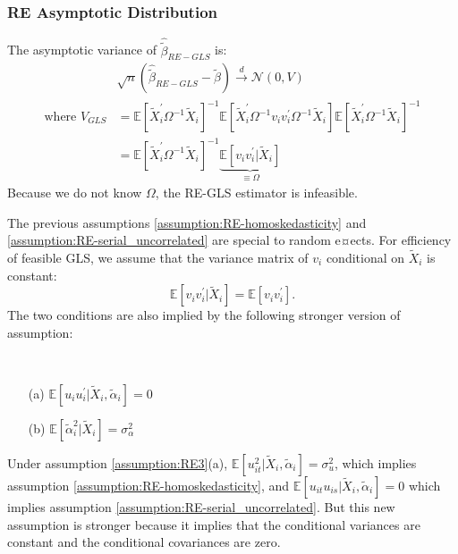 \subsubsection{RE Asymptotic Distribution}
The asymptotic variance of $\hat{\tilde{\beta}}_{RE-GLS}$ is:
\begin{align*}
    &\sqrt{n} \left( \hat{\tilde{\beta}}_{RE-GLS} - \tilde{\beta} \right) \overset{d}{\rightarrow} \mathcal{N}\left(0, V \right) \\
    \text{where } V_{GLS}  &= \mathbb{E}\left[\tilde{X}_i^{\prime} \Omega^{-1} \tilde{X}_i \right]^{-1} \mathbb{E}\left[\tilde{X}_i^{\prime} \Omega^{-1} v_i v_i^{\prime} \Omega^{-1} \tilde{X}_i \right] \mathbb{E}\left[\tilde{X}_i^{\prime} \Omega^{-1} \tilde{X}_i \right]^{-1} \\
    &= \mathbb{E}\left[\tilde{X}_i^{\prime} \Omega^{-1} \tilde{X}_i \right]^{-1} \underset{\equiv \Omega}{\underbrace{\mathbb{E}[v_i v_i^{\prime} | \tilde{X}_i]}}
\end{align*}
Because we do not know $\Omega$, the RE-GLS estimator is infeasible. 


The previous assumptions \ref{assumption:RE-homoskedasticity} and \ref{assumption:RE-serial_uncorrelated} are special to random e¤ects.
For efficiency of feasible GLS, we assume that the variance matrix of $v_i$ conditional on $\tilde{X}_i$ is constant:
\[\mathbb{E}[v_i v_i^{\prime} | \tilde{X}_i] = \mathbb{E}[v_i v_i^{\prime} ].\]
The two conditions are also implied by the following stronger version of assumption:
\begin{assumption}\label{assumption:RE3}
    \
    \begin{enumerate}
        \item[(a)] $\mathbb{E}[u_i u_i^{\prime} | \tilde{X}_i, \tilde{\alpha}_i] = 0$
        \item[(b)] $\mathbb{E}[\tilde{\alpha}_i^2 | \tilde{X}_i] = \sigma_{\alpha}^2 $  
    \end{enumerate}
\end{assumption}
Under assumption \ref{assumption:RE3}(a), $\mathbb{E}[u_{it}^2 | \tilde{X}_i, \tilde{\alpha}_i] = \sigma_u^2$,
which implies assumption \ref{assumption:RE-homoskedasticity}, and $\mathbb{E}[u_{it} u_{is} | \tilde{X}_i, \tilde{\alpha}_i] = 0$
which implies assumption \ref{assumption:RE-serial_uncorrelated}. 
But this new assumption is stronger because it implies that the conditional variances are constant and the conditional covariances are zero.

